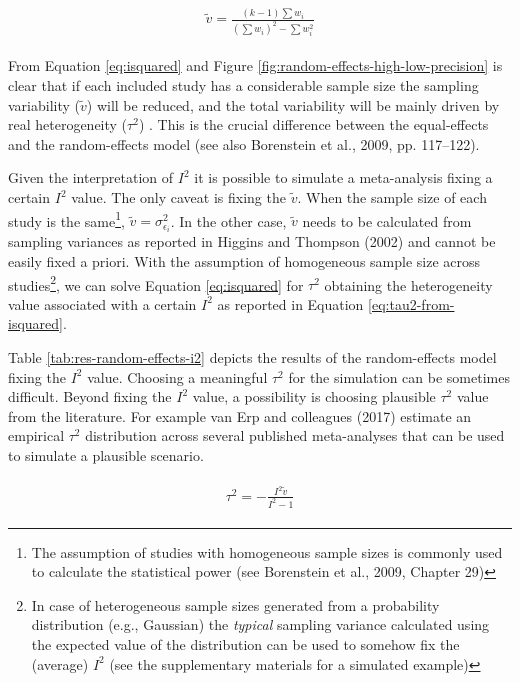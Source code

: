 \documentclass[
  man,floatsintext]{apa6}
\begin{document}
\begin{align}
\begin{gathered}
\tilde{v} = \frac{(k-1) \sum w_i}{(\sum w_i)^2 - \sum w_i^2}
\label{eq:typical-v}
\end{gathered}
\end{align}

From Equation \eqref{eq:isquared} and Figure \ref{fig:random-effects-high-low-precision} is clear that if each included study has a considerable sample size the sampling variability (\(\tilde{v}\)) will be reduced, and the total variability will be mainly driven by real heterogeneity (\(\tau^2\)) . This is the crucial difference between the equal-effects and the random-effects model (see also Borenstein et al., 2009, pp. 117--122).

Given the interpretation of \(I^{2}\) it is possible to simulate a meta-analysis fixing a certain \(I^{2}\) value. The only caveat is fixing the \(\tilde{v}\). When the sample size of each study is the same\footnote{ The assumption of studies with homogeneous sample sizes is commonly used to calculate the statistical power (see Borenstein et al., 2009, Chapter 29)}, \(\tilde{v} = \sigma_{\epsilon_i}^{2}\). In the other case, \(\tilde{v}\) needs to be calculated from sampling variances as reported in Higgins and Thompson (2002) and cannot be easily fixed a priori. With the assumption of homogeneous sample size across studies\footnote{In case of heterogeneous sample sizes generated from a probability distribution (e.g., Gaussian) the \emph{typical} sampling variance calculated using the expected value of the distribution can be used to somehow fix the (average) \(I^2\) (see the supplementary materials for a simulated example)}, we can solve Equation \eqref{eq:isquared} for \(\tau^{2}\) obtaining the heterogeneity value associated with a certain \(I^{2}\) as reported in Equation \eqref{eq:tau2-from-isquared}.

Table \ref{tab:res-random-effects-i2} depicts the results of the random-effects model fixing the \(I^{2}\) value. Choosing a meaningful \(\tau^2\) for the simulation can be sometimes difficult. Beyond fixing the \(I^2\) value, a possibility is choosing plausible \(\tau^2\) value from the literature. For example van Erp and colleagues (2017) estimate an empirical \(\tau^2\) distribution across several published meta-analyses that can be used to simulate a plausible scenario.

\begin{align}
\begin{gathered}
\tau^2 = - \frac{I^2\tilde{v}}{I^2 - 1}
\label{eq:tau2-from-isquared}
\end{gathered}
\end{align}
\end{document}
